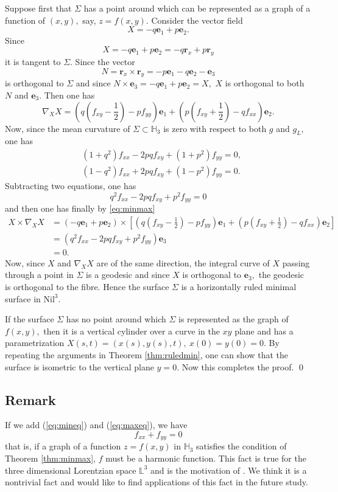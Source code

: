 \documentclass[11pt]{amsart}
\begin{document}
\noindent[Proof] Suppose first that $\Sigma$ has a point around
which can be represented as a graph of a function of $(x,y),$ say,
$z=f(x,y).$ Consider the vector field
$$X=-q{\mathbf{e}}_1+p{\mathbf{e}}_2.$$
Since
\[ X=-q{\mathbf{e}}_1+p{\mathbf{e}}_2
=-q{\mathbf{r}}_x+p{\mathbf{r}}_y
\]
it is tangent to $\Sigma.$ Since the vector \[
N={\mathbf{r}}_x\times{\mathbf{r}}_y =-p{\mathbf{e}}_1-q{\mathbf{e}}_2-{\mathbf{e}}_3
\]
is orthogonal to $\Sigma$ and since $
N\times{\mathbf{e}}_3=-q{\mathbf{e}}_1+p{\mathbf{e}}_2=X,$ $X$ is orthogonal to both $N$
and ${\mathbf{e}}_3.$ Then one has
\[
\nabla_XX
= \left(q\left(f_{xy}-\frac12\right)-pf_{yy}\right){\mathbf{e}}_1 +
\left(p\left(f_{xy}+\frac12\right)-qf_{xx}\right){\mathbf{e}}_2.
\]
Now, since the mean curvature of $\Sigma\subset {\mathbb{H}}_3$ is zero
with respect to both $g$ and $g_L,$ one has
\begin{align}
&(1+q^2)f_{xx}-2pqf_{xy}+(1+p^2)f_{yy}=0,\label{eq:mineq}\\
&(1-q^2)f_{xx}+2pqf_{xy}+(1-p^2)f_{yy}=0.\label{eq:maxeq}
\end{align}
Subtracting two equations, one has
\begin{equation}\label{eq:minmax}
q^2f_{xx}-2pqf_{xy}+p^2f_{yy}=0
\end{equation}
and then one has finally by \eqref{eq:minmax}
\[
\begin{split}
X\times\nabla_XX&=(-q{\mathbf{e}}_1+p{\mathbf{e}}_2)\times\left[
\left(q\left(f_{xy}-\frac12\right)-pf_{yy}\right){\mathbf{e}}_1 +
\left(p\left(f_{xy}+\frac12\right)-qf_{xx}\right){\mathbf{e}}_2\right]\\
&=(q^2f_{xx}-2pqf_{xy}+p^2f_{yy}){\mathbf{e}}_3\\&=0.
\end{split}
\]
Now, since $X$ and $\nabla_XX$ are of the same direction, the
integral curve of $X$ passing through a point in $\Sigma$ is a
geodesic and since $X$ is orthogonal to ${\mathbf{e}}_3,$ the geodesic is
orthogonal to the fibre. Hence the surface $\Sigma$ is a
horizontally ruled minimal surface in $\text{Nil}^3.$

If the surface $\Sigma$ has no point around which $\Sigma$ is
represented as the graph of $f(x,y),$ then it is a vertical
cylinder over a curve in the $xy$ plane and has a parametrization
$X(s,t)=(x(s),y(s),t),\  x(0)=y(0)=0.$ By repeating the arguments
in Theorem \ref{thm:ruledmin}, one can show that the surface is
isometric to the vertical plane $y=0.$ Now this completes the
proof.
 \qed

\subsection{Remark} If we add (\ref{eq:mineq}) and (\ref{eq:maxeq}), we have
\[ f_{xx}+f_{yy}=0 \]
that is, if a graph of a function $z=f(x,y)$ in ${\mathbb{H}}_3$ satisfies
the condition of Theorem \ref{thm:minmax}, $f$ must be a harmonic
function. This fact is true for the three dimensional Lorentzian
space ${\mathbb{L}}^3$ and is the motivation of \cite{KLY}. We think it is
a nontrivial fact and would like to find applications of this fact
in the future study.
\end{document}

